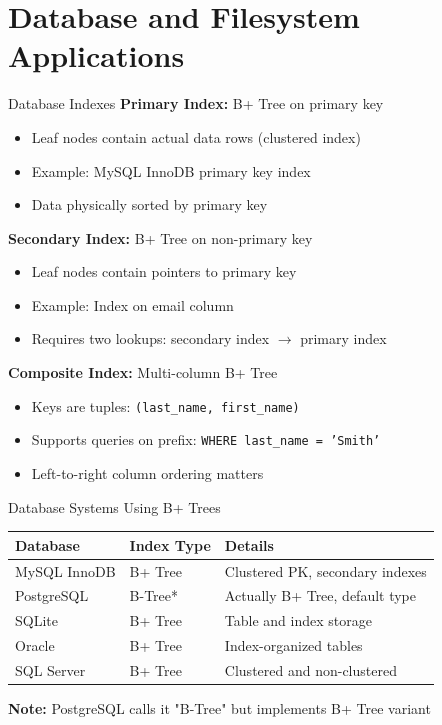 \documentclass[aspectratio=169]{beamer}
\begin{document}
\section{Database and Filesystem Applications}

\begin{frame}{Database Indexes}
  \textbf{Primary Index:} B+ Tree on primary key
  \begin{itemize}
    \item Leaf nodes contain actual data rows (clustered index)
    \item Example: MySQL InnoDB primary key index
    \item Data physically sorted by primary key
  \end{itemize}

  \vspace{0.3cm}
  \textbf{Secondary Index:} B+ Tree on non-primary key
  \begin{itemize}
    \item Leaf nodes contain pointers to primary key
    \item Example: Index on email column
    \item Requires two lookups: secondary index $\rightarrow$ primary index
  \end{itemize}

  \vspace{0.3cm}
  \textbf{Composite Index:} Multi-column B+ Tree
  \begin{itemize}
    \item Keys are tuples: \texttt{(last\_name, first\_name)}
    \item Supports queries on prefix: \texttt{WHERE last\_name = 'Smith'}
    \item Left-to-right column ordering matters
  \end{itemize}
\end{frame}

\begin{frame}{Database Systems Using B+ Trees}
  \begin{center}
  \begin{tabular}{|l|l|p{5cm}|}
    \hline
    \textbf{Database} & \textbf{Index Type} & \textbf{Details} \\
    \hline
    MySQL InnoDB & B+ Tree & Clustered PK, secondary indexes \\
    \hline
    PostgreSQL & B-Tree* & Actually B+ Tree, default type \\
    \hline
    SQLite & B+ Tree & Table and index storage \\
    \hline
    Oracle & B+ Tree & Index-organized tables \\
    \hline
    SQL Server & B+ Tree & Clustered and non-clustered \\
    \hline
  \end{tabular}
  \end{center}

  \vspace{0.3cm}
  \textbf{Note:} PostgreSQL calls it "B-Tree" but implements B+ Tree variant
\end{frame}
\end{document}
